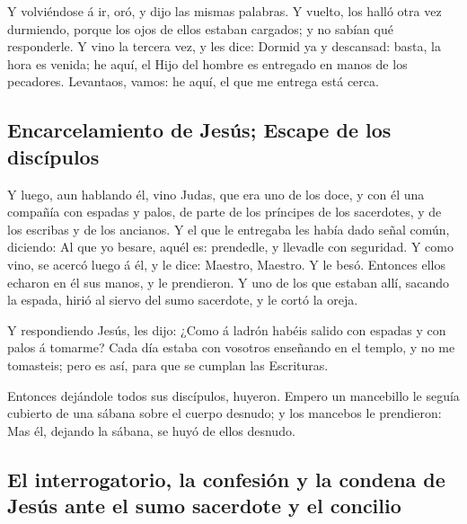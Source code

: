  Y volviéndose á ir, oró, y dijo las mismas palabras.
 Y vuelto, los halló otra vez durmiendo, porque los ojos
de ellos estaban cargados; y no sabían qué responderle. 
Y vino la tercera vez, y les dice: Dormid ya y descansad: basta, la hora
es venida; he aquí, el Hijo del hombre es entregado en manos de los
pecadores.  Levantaos, vamos: he aquí, el que me entrega
está cerca.

\hypertarget{encarcelamiento-de-jesuxfas-escape-de-los-discuxedpulos}{%
\subsection{Encarcelamiento de Jesús; Escape de los
discípulos}\label{encarcelamiento-de-jesuxfas-escape-de-los-discuxedpulos}}

 Y luego, aun hablando él, vino Judas, que era uno de los
doce, y con él una compañía con espadas y palos, de parte de los
príncipes de los sacerdotes, y de los escribas y de los ancianos.
 Y el que le entregaba les había dado señal común,
diciendo: Al que yo besare, aquél es: prendedle, y llevadle con
seguridad.  Y como vino, se acercó luego á él, y le dice:
Maestro, Maestro. Y le besó.  Entonces ellos echaron en
él sus manos, y le prendieron.  Y uno de los que estaban
allí, sacando la espada, hirió al siervo del sumo sacerdote, y le cortó
la oreja.

 Y respondiendo Jesús, les dijo: ¿Como á ladrón habéis
salido con espadas y con palos á tomarme?  Cada día
estaba con vosotros enseñando en el templo, y no me tomasteis; pero es
así, para que se cumplan las Escrituras.

 Entonces dejándole todos sus discípulos, huyeron.
 Empero un mancebillo le seguía cubierto de una sábana
sobre el cuerpo desnudo; y los mancebos le prendieron: 
Mas él, dejando la sábana, se huyó de ellos desnudo.

\hypertarget{el-interrogatorio-la-confesiuxf3n-y-la-condena-de-jesuxfas-ante-el-sumo-sacerdote-y-el-concilio}{%
\subsection{El interrogatorio, la confesión y la condena de Jesús ante
el sumo sacerdote y el
concilio}\label{el-interrogatorio-la-confesiuxf3n-y-la-condena-de-jesuxfas-ante-el-sumo-sacerdote-y-el-concilio}}

